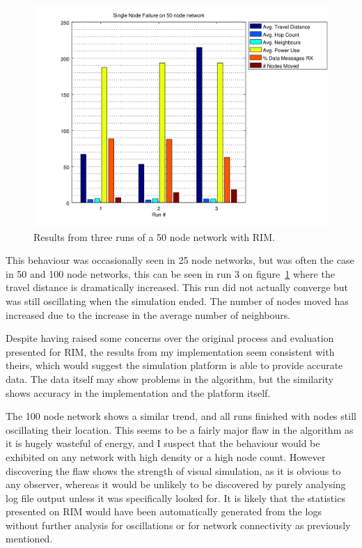 \documentclass[authoryearcitations]{UoYCSproject}
\begin{document}
\begin{figure}
 \centering
    \includegraphics[width=\textwidth]{figures/singlefail_50node.png}
    \caption{Results from three runs of a 50 node network with RIM.}
    \label{fig:singlefail_50node}
\end{figure}

This behaviour was occasionally seen in 25 node networks, but was often the case in 50 and 100 node networks, this can be seen in run 3 on figure~\ref{fig:singlefail_50node} where the travel distance is dramatically increased. This run did not actually converge but was still oscillating when the simulation ended. The number of nodes moved has increased due to the increase in the average number of neighbours.

Despite having raised some concerns over the original process and evaluation presented for RIM, the results from my implementation seem consistent with theirs, which would suggest the simulation platform is able to provide accurate data. The data itself may show problems in the algorithm, but the similarity shows accuracy in the implementation and the platform itself.

The 100 node network shows a similar trend, and all runs finished with nodes still oscillating their location. This seems to be a fairly major flaw in the algorithm as it is hugely wasteful of energy, and I suspect that the behaviour would be exhibited on any network with high density or a high node count. However discovering the flaw shows the strength of visual simulation, as it is obvious to any observer, whereas it would be unlikely to be discovered by purely analysing log file output unless it was specifically looked for. It is likely that the statistics presented on RIM would have been automatically generated from the logs without further analysis for oscillations or for network connectivity as previously mentioned.
\end{document}
